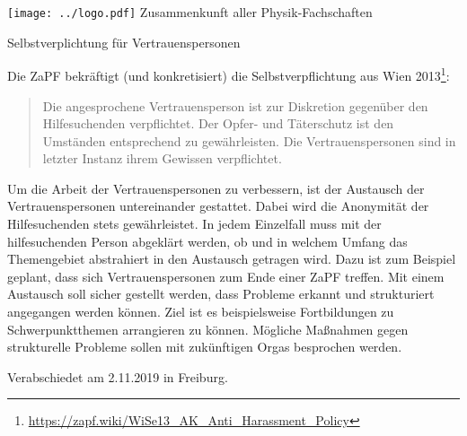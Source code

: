 \documentclass[DIV=calc]{scrartcl}
\begin{document}
    \hspace{0.87\textwidth}
    \begin{minipage}{120pt}
        \vspace{-1.8cm}
        \texttt{[image: ../logo.pdf]}
        \centering
        \small Zusammenkunft aller Physik-Fachschaften
    \end{minipage}
    \begin{center}
      \vspace{1cm}
      \huge{Selbstverplichtung für Vertrauenspersonen}\vspace{.25\baselineskip}\\
      \normalsize
    \end{center}


Die ZaPF bekräftigt (und konkretisiert) die Selbstverpflichtung aus Wien 2013\footnote{\url{https://zapf.wiki/WiSe13_AK_Anti_Harassment_Policy}}:
\begin{quote}
	Die angesprochene Vertrauensperson ist zur Diskretion gegenüber den Hilfesuchenden verpflichtet.
	Der Opfer- und Täterschutz ist den Umständen entsprechend zu gewährleisten.
	Die Vertrauenspersonen sind in letzter Instanz ihrem Gewissen verpflichtet.
\end{quote}
Um die Arbeit der Vertrauenspersonen zu verbessern, ist der Austausch der Vertrauenspersonen untereinander gestattet.
Dabei wird die Anonymität der Hilfesuchenden stets gewährleistet.
In jedem Einzelfall muss mit der hilfesuchenden Person abgeklärt werden, ob und in welchem Umfang das Themengebiet abstrahiert in den Austausch getragen wird.
Dazu ist zum Beispiel geplant, dass sich Vertrauenspersonen zum Ende einer ZaPF treffen.
Mit einem Austausch soll sicher gestellt werden, dass Probleme erkannt und strukturiert angegangen werden können.
Ziel ist es beispielsweise Fortbildungen zu Schwerpunktthemen arrangieren zu können.
Mögliche Maßnahmen gegen strukturelle Probleme sollen mit zukünftigen Orgas besprochen werden.

\vfill
    \begin{flushright}
        Verabschiedet am 2.11.2019 in Freiburg.
    \end{flushright}
\end{document}
